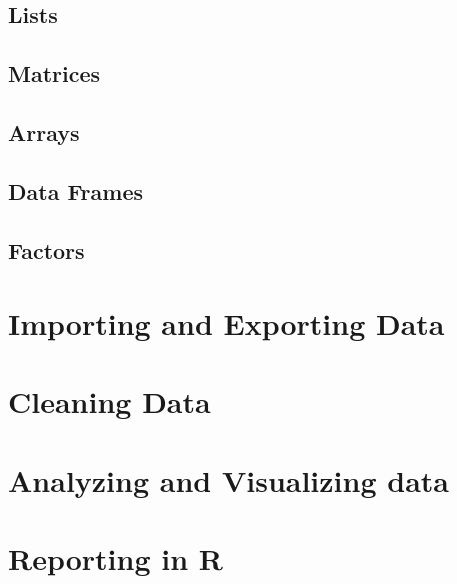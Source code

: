 \documentclass[
]{article}
\begin{document}
\hypertarget{lists}{%
\subsection{Lists}\label{lists}}

\hypertarget{matrices}{%
\subsection{Matrices}\label{matrices}}

\hypertarget{arrays}{%
\subsection{Arrays}\label{arrays}}

\hypertarget{data-frames}{%
\subsection{Data Frames}\label{data-frames}}

\hypertarget{factors}{%
\subsection{Factors}\label{factors}}

\hypertarget{importing-and-exporting-data}{%
\section{Importing and Exporting
Data}\label{importing-and-exporting-data}}

\hypertarget{cleaning-data}{%
\section{Cleaning Data}\label{cleaning-data}}

\hypertarget{analyzing-and-visualizing-data}{%
\section{Analyzing and Visualizing
data}\label{analyzing-and-visualizing-data}}

\hypertarget{reporting-in-r}{%
\section{Reporting in R}\label{reporting-in-r}}
\end{document}
